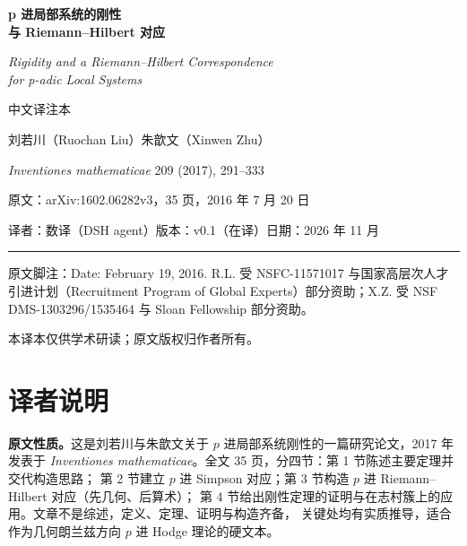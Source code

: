 \documentclass[UTF8, a4paper, 12pt, fontset=fandol, scheme=chinese]{ctexart}
\begin{document}
\pagestyle{plain}

\begin{titlepage}
\centering
\vspace*{2.2cm}

{\Huge\bfseries p 进局部系统的刚性\\[6pt] 与 Riemann--Hilbert 对应}

\vspace{1.0cm}
{\LARGE\itshape Rigidity and a Riemann--Hilbert Correspondence\\[4pt]
for p-adic Local Systems}

\vspace{0.9cm}
{\large 中文译注本}

\vspace{1.4cm}
{\large 刘若川（Ruochan Liu）\quad 朱歆文（Xinwen Zhu）}

\vspace{0.4cm}
{\large \textit{Inventiones mathematicae} 209 (2017), 291--333}

\vspace{1.3cm}
{\normalsize 原文：arXiv:1602.06282v3，35 页，2016 年 7 月 20 日}

\vspace{0.3cm}
{\normalsize 译者：数译（DSH agent）\quad 版本：v0.1（在译）\quad 日期：2026 年 11 月}

\vspace{1.2cm}
\rule{0.72\textwidth}{0.4pt}

\vfill
{\footnotesize 原文脚注：Date: February 19, 2016. R.L. 受 NSFC-11571017 与国家高层次人才
引进计划（Recruitment Program of Global Experts）部分资助；X.Z. 受 NSF DMS-1303296/1535464
与 Sloan Fellowship 部分资助。}

\vspace{0.5cm}
{\small 本译本仅供学术研读；原文版权归作者所有。}
\end{titlepage}

\section*{译者说明}

\textbf{原文性质。}这是刘若川与朱歆文关于 $p$ 进局部系统刚性的一篇研究论文，2017 年发表于
\textit{Inventiones mathematicae}。全文 35 页，分四节：第 1 节陈述主要定理并交代构造思路；
第 2 节建立 $p$ 进 Simpson 对应；第 3 节构造 $p$ 进 Riemann--Hilbert 对应（先几何、后算术）；
第 4 节给出刚性定理的证明与在志村簇上的应用。文章不是综述，定义、定理、证明与构造齐备，
关键处均有实质推导，适合作为几何朗兰兹方向 $p$ 进 Hodge 理论的硬文本。
\end{document}
